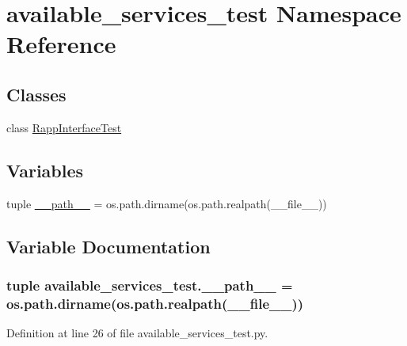 \hypertarget{namespaceavailable__services__test}{\section{available\-\_\-services\-\_\-test Namespace Reference}
\label{namespaceavailable__services__test}
}
\subsection*{Classes}
\begin{DoxyCompactItemize}
\item 
class \hyperlink{classavailable__services__test_1_1RappInterfaceTest}{Rapp\-Interface\-Test}
\end{DoxyCompactItemize}
\subsection*{Variables}
\begin{DoxyCompactItemize}
\item 
tuple \hyperlink{namespaceavailable__services__test_a75978baaf50e84205aac6454ee2375be}{\-\_\-\-\_\-path\-\_\-\-\_\-} = os.\-path.\-dirname(os.\-path.\-realpath(\-\_\-\-\_\-file\-\_\-\-\_\-))
\end{DoxyCompactItemize}


\subsection{Variable Documentation}
\hypertarget{namespaceavailable__services__test_a75978baaf50e84205aac6454ee2375be}{
\subsubsection[{\-\_\-\-\_\-path\-\_\-\-\_\-}]{\setlength{\rightskip}{0pt plus 5cm}tuple available\-\_\-services\-\_\-test.\-\_\-\-\_\-path\-\_\-\-\_\- = os.\-path.\-dirname(os.\-path.\-realpath(\-\_\-\-\_\-file\-\_\-\-\_\-))}}\label{namespaceavailable__services__test_a75978baaf50e84205aac6454ee2375be}


Definition at line 26 of file available\-\_\-services\-\_\-test.\-py.

